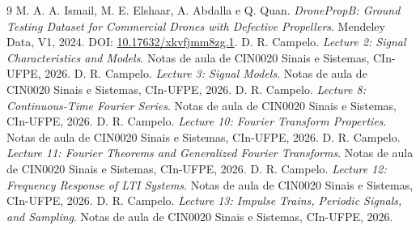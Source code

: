 \documentclass[a4paper]{article}
\begin{document}
\begin{thebibliography}{9}
 M. A. A. Ismail, M. E. Elshaar, A. Abdalla e Q. Quan. \textit{DronePropB: Ground Testing Dataset for Commercial Drones with Defective Propellers}. Mendeley Data, V1, 2024. DOI: \href{https://doi.org/10.17632/xkvfjmm8zg.1}{10.17632/xkvfjmm8zg.1}.
 D. R. Campelo. \textit{Lecture 2: Signal Characteristics and Models}. Notas de aula de CIN0020 Sinais e Sistemas, CIn-UFPE, 2026.
 D. R. Campelo. \textit{Lecture 3: Signal Models}. Notas de aula de CIN0020 Sinais e Sistemas, CIn-UFPE, 2026.
 D. R. Campelo. \textit{Lecture 8: Continuous-Time Fourier Series}. Notas de aula de CIN0020 Sinais e Sistemas, CIn-UFPE, 2026.
 D. R. Campelo. \textit{Lecture 10: Fourier Transform Properties}. Notas de aula de CIN0020 Sinais e Sistemas, CIn-UFPE, 2026.
 D. R. Campelo. \textit{Lecture 11: Fourier Theorems and Generalized Fourier Transforms}. Notas de aula de CIN0020 Sinais e Sistemas, CIn-UFPE, 2026.
 D. R. Campelo. \textit{Lecture 12: Frequency Response of LTI Systems}. Notas de aula de CIN0020 Sinais e Sistemas, CIn-UFPE, 2026.
 D. R. Campelo. \textit{Lecture 13: Impulse Trains, Periodic Signals, and Sampling}. Notas de aula de CIN0020 Sinais e Sistemas, CIn-UFPE, 2026.
\end{thebibliography}
\end{document}
